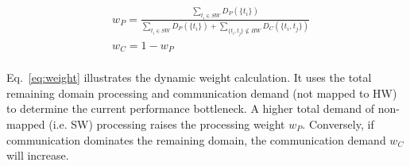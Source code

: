 \begingroup\makeatletter{}\check@mathfonts
\begin{equation}
\begin{split}
\label{eq:weight}
	&w_{P} = \frac{\sum_{t_{i} \in SW} D_{P}(\{t_{i}\}) }{ \sum_{t_{i} \in SW} D_{P}(\{t_{i}\}) + \sum_{ \{t_{i}, t_{j}\} \nsubseteq HW} D_{C}(\{t_{i},t_{j}\}) }\\
	&w_{C} = 1 - w_P\\	
\end{split}
\end{equation}
\endgroup

Eq.~\eqref{eq:weight} illustrates the dynamic weight calculation. It uses the total remaining domain processing and communication demand (not mapped to HW) to determine the current performance bottleneck. A higher total demand of non-mapped (i.e. SW) processing raises the processing weight $w_P$. Conversely, if communication dominates the remaining domain, the communication demand $w_C$ will increase. 




